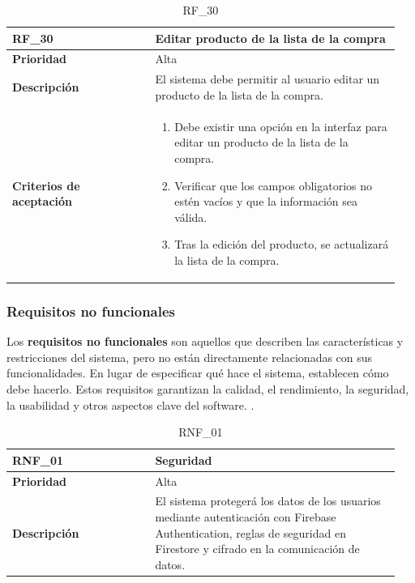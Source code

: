 \begin{table}[htb!]
    \begin{tabular}{|p{0.35\linewidth}|p{0.6\linewidth}|}
        \hline
        \rowcolor[HTML]{C0C0C0}  
        \textbf{RF\_30} & \textbf{Editar producto de la lista de la compra} \\ 
        \hline
        \textbf{Prioridad} & Alta \\ 
        \hline
        \textbf{Descripción} & El sistema debe permitir al usuario editar un producto de la lista de la compra. \\ 
        \hline
        \vspace{0.5mm}
        \textbf{Criterios de aceptación} & 
        \begin{minipage}[t]{0.9\linewidth}
            \begin{enumerate}
                \item Debe existir una opción en la interfaz para editar un producto de la lista de la compra.
                \item Verificar que los campos obligatorios no estén vacíos y que la información sea válida.
                \item Tras la edición del producto, se actualizará la lista de la compra.
            \end{enumerate}
            \vspace{2mm}
        \end{minipage} \\ 
        \hline
    \end{tabular}
    \caption{RF\_30}
    \label{req:RF30}
\end{table}


\clearpage

\subsubsection{Requisitos no funcionales}

Los \textbf{requisitos no funcionales} son aquellos que describen las características y restricciones del sistema, pero no están 
directamente relacionadas con sus funcionalidades. En lugar de especificar qué hace el sistema, establecen cómo debe hacerlo.
Estos requisitos garantizan la calidad, el rendimiento, la seguridad, la usabilidad y otros aspectos clave del software. \cite{sommerville2015}.

\begin{table}[htb!]
    \begin{tabular}{|p{0.35\linewidth}|p{0.6\linewidth}|}
        \hline
        \rowcolor[HTML]{C0C0C0}
        \textbf{RNF\_01} & \textbf{Seguridad} \\
        \hline
        \textbf{Prioridad} & Alta \\
        \hline
        \textbf{Descripción} & 
        El sistema protegerá los datos de los usuarios mediante autenticación con Firebase Authentication, 
        reglas de seguridad en Firestore y cifrado en la comunicación de datos. \\
        \hline
    \end{tabular}
    \label{req:RNF_01}
    \caption{RNF\_01}
\end{table}


